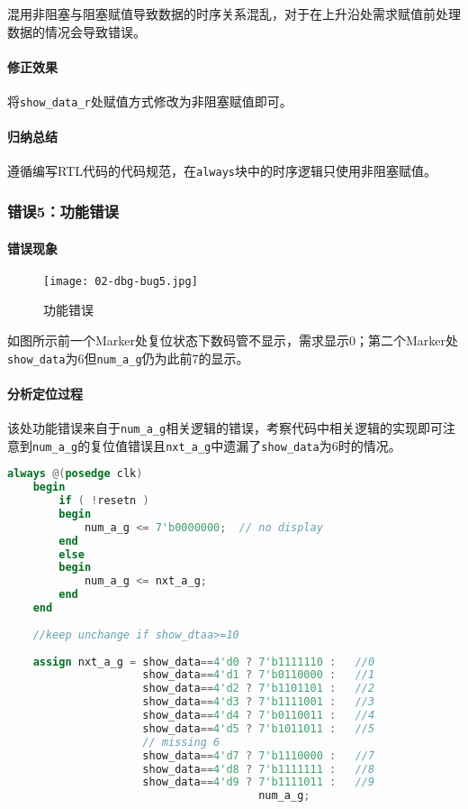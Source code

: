 \documentclass[UTF-8,twoside,c5size]{ctexart}
\begin{document}
	混用非阻塞与阻塞赋值导致数据的时序关系混乱，对于在上升沿处需求赋值前处理数据的情况会导致错误。
	
	\paragraph{修正效果}\hfill
	
	将\texttt{show\_data\_r}处赋值方式修改为非阻塞赋值即可。
	
	\paragraph{归纳总结}\hfill
	
	遵循编写RTL代码的代码规范，在\texttt{always}块中的时序逻辑只使用非阻塞赋值。
	
	\subsubsection{错误5：功能错误}
	
	\paragraph{错误现象}\hfill
	
	\begin{figure}[!h]
		\centering
		\texttt{[image: 02-dbg-bug5.jpg]}
		\caption{功能错误}
	\end{figure}

	如图所示前一个Marker处复位状态下数码管不显示，需求显示0；第二个Marker处\texttt{show\_data}为6但\texttt{num\_a\_g}仍为此前7的显示。
	
	\paragraph{分析定位过程}\hfill
	
	该处功能错误来自于\texttt{num\_a\_g}相关逻辑的错误，考察代码中相关逻辑的实现即可注意到\texttt{num\_a\_g}的复位值错误且\texttt{nxt\_a\_g}中遗漏了\texttt{show\_data}为6时的情况。
	
	\begin{lstlisting}[language=verilog]
	always @(posedge clk)
	begin
		if ( !resetn )
		begin
			num_a_g <= 7'b0000000;	// no display
		end
		else
		begin
			num_a_g <= nxt_a_g;
		end
	end
	
	//keep unchange if show_dtaa>=10
	
	assign nxt_a_g = show_data==4'd0 ? 7'b1111110 :   //0
					 show_data==4'd1 ? 7'b0110000 :   //1
					 show_data==4'd2 ? 7'b1101101 :   //2
					 show_data==4'd3 ? 7'b1111001 :   //3
					 show_data==4'd4 ? 7'b0110011 :   //4
					 show_data==4'd5 ? 7'b1011011 :   //5
					 // missing 6
					 show_data==4'd7 ? 7'b1110000 :   //7
					 show_data==4'd8 ? 7'b1111111 :   //8
					 show_data==4'd9 ? 7'b1111011 :   //9
					 				   num_a_g;
	\end{lstlisting}
	
\end{document}
